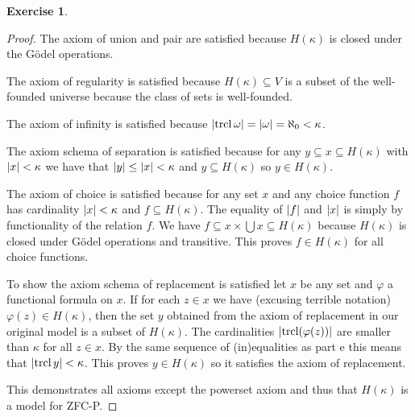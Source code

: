 \documentclass{article}
\theoremstyle{definition}
\newtheorem{question}{Exercise}
\DeclareMathOperator{\trcl}{trcl}
\DeclarePairedDelimiter{\abs}{|}{|}
\begin{document}
\begin{question}
\begin{enumerate}[a.]
\begin{proof}
                  The axiom of union and pair are satisfied because
                  \(H(\kappa)\) is closed under the Gödel operations.

                  The axiom of regularity is satisfied because
                  \(H(\kappa)\subseteq V\) is a subset of the well-founded
                  universe because the class of sets is well-founded.

                  The axiom of infinity is satisfied because
                  \(\abs{\trcl{\omega}}=\abs{\omega}=\aleph_{0}<\kappa\).

                  The axiom schema of separation is satisfied because for any
                  \(y\subseteq x\subseteq H(\kappa)\) with \(\abs{x}<\kappa\) we
                  have that \(\abs{y}\leq\abs{x}<\kappa\) and \(y\subseteq
                  H(\kappa)\) so \(y\in H(\kappa)\).

                  The axiom of choice is satisfied because for any set \(x\) and
                  any choice function \(f\) has cardinality \(\abs{x}<\kappa\)
                  and \(f\subseteq H(\kappa)\). The equality of \(\abs{f}\) and
                  \(\abs{x}\) is simply by functionality of the relation \(f\).
                  We have \(f\subseteq x\times\bigcup x\subseteq H(\kappa)\)
                  because \(H(\kappa)\) is closed under Gödel operations and
                  transitive. This proves \(f\in H(\kappa)\) for all choice
                  functions.

                  To show the axiom schema of replacement is satisfied let \(x\)
                  be any set and \(\varphi\) a functional formula on \(x\). If
                  for each \(z\in x\) we have (excusing terrible notation)
                  \(\varphi(z)\in H(\kappa)\), then the set \(y\) obtained from
                  the axiom of replacement in our original model is a subset of
                  \(H(\kappa)\). The cardinalities \(\abs{\trcl(\varphi(z))}\)
                  are smaller than \(\kappa\) for all \(z\in x\). By the same
                  sequence of (in)equalities as part e this means that
                  \(\abs{\trcl{y}}<\kappa\). This proves \(y\in H(\kappa)\) so
                  it satisfies the axiom of replacement.

                  This demonstrates all axioms except the powerset axiom and
                  thus that \(H(\kappa)\) is a model for ZFC-P.
              \end{proof}


\end{enumerate}
\end{question}
\end{document}
